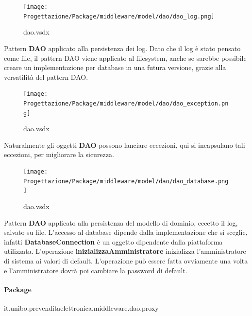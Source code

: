 \documentclass[a4paper]{article}
\begin{document}



\begin{figure}[H]
    \texttt{[image: Progettazione/Package/middleware/model/dao/dao\_log.png]}
    \centering
    \caption{dao.vsdx}
\end{figure}

Pattern \textbf{DAO} applicato alla persistenza dei log. Dato che il log è stato pensato come file, il pattern DAO viene applicato al filesystem, anche se sarebbe possibile creare un implementazione per database in una futura versione, grazie alla versatilità del pattern DAO.

\begin{figure}[H]
    \texttt{[image: Progettazione/Package/middleware/model/dao/dao\_exception.png]}
    \centering
    \caption{dao.vsdx}
\end{figure}

Naturalmente gli oggetti \textbf{DAO} possono lanciare eccezioni, qui si incapsulano tali eccezioni, per migliorare la sicurezza.

\newpage

\begin{figure}[H]
    \texttt{[image: Progettazione/Package/middleware/model/dao/dao\_database.png]}
    \centering
    \caption{dao.vsdx}
\end{figure}

Pattern \textbf{DAO} applicato alla persistenza del modello di dominio, eccetto il log, salvato su file. L'accesso al database dipende dalla implementazione che si sceglie, infatti \textbf{DatabaseConnection} è un oggetto dipendente dalla piattaforma utilizzata. L'operazione \textbf{inizializzaAmministratore} inizializza l'amministratore di sistema ai valori di default. L'operazione può essere fatta ovviamente una volta e l'amministratore dovrà poi cambiare la password di default.

\newpage

\paragraph{Package} it.unibo.prevenditaelettronica.middleware.dao.proxy

\end{document}
